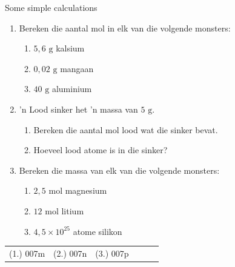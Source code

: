            \begin{exercises} {Some simple calculations}
            \nopagebreak \noindent \vspace{-2cm}
      \label{m38717*id278090}\begin{enumerate}[noitemsep, label=\textbf{\arabic*}. ] 
            \label{m38717*uid24}\item Bereken die aantal mol in elk van die volgende monsters:
\label{m38717*id278106}\begin{enumerate}[noitemsep, label=\textbf{\alph*}. ] 
            \label{m38717*uid25}\item $5,6 \text{ g}$ kalsium
\label{m38717*uid26}\item $0,02 \text{ g}$ mangaan
\label{m38717*uid27}\item $40\text{ g}$ aluminium
\end{enumerate}
               \label{m38717*uid28}\item 'n Lood sinker het 'n massa van $5 \text{ g}$.
\label{m38717*id278159}\begin{enumerate}[noitemsep, label=\textbf{\alph*}. ] 
            \label{m38717*uid29}\item Bereken die aantal mol lood wat die sinker bevat.
\label{m38717*uid30}\item Hoeveel lood atome is in die sinker?
\end{enumerate}
                \label{m38717*uid31}\item Bereken die massa van elk van die volgende monsters:
\label{m38717*id278201}\begin{enumerate}[noitemsep, label=\textbf{\alph*}. ] 
            \label{m38717*uid32}\item $2,5\text{ mol}$ magnesium
\label{m38717*uid33}\item $12 \text{ mol}$ litium
\label{m38717*uid34}\item $4,5 \times 10^{25}$ atome silikon
\end{enumerate}
                \end{enumerate}
\practiceinfo
\par 
 \par \begin{tabular}[h]{cccccc}
 (1.) 007m  &  (2.) 007n  &  (3.) 007p  & \end{tabular}
\end{exercises}
